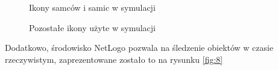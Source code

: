 \documentclass[a4paper,11pt,titlepage]{article}
\begin{document}
\begin{figure}[H]%
    \centering
    \qquad
    \caption{Ikony samców i samic w symulacji}%
    \label{fig:icons1}%
\end{figure}

\begin{figure}[H]%
    \centering
    \qquad
    \caption{Pozostałe ikony użyte w symulacji}%
    \label{fig:icons2}%
\end{figure}

Dodatkowo, środowisko NetLogo pozwala na śledzenie obiektów w czasie rzeczywistym, zaprezentowane zostało to na rysunku \ref{fig:8}
\end{document}
